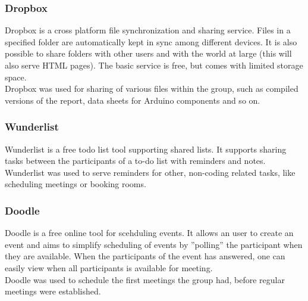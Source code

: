 \subsubsection{Dropbox}
Dropbox is a cross platform file synchronization and sharing service. Files in a specified folder are automatically kept in sync among different devices. It is also possible to share folders with other users and with the world at large (this will also serve HTML pages). The basic service is free, but comes with limited storage space.\\
Dropbox was used for sharing of various files within the group, such as compiled versions of the report, data sheets for Arduino components and so on. 

\subsubsection{Wunderlist}
Wunderlist is a free todo list tool supporting shared lists. It supports sharing tasks between the participants of a to-do list with reminders and notes.\\
Wunderlist was used to serve reminders for other, non-coding related tasks, like scheduling meetings or booking rooms.

\subsubsection{Doodle}
Doodle is a free online tool for scehduling events. It allows an user to create an event and aims to simplify scheduling of events by ''polling'' the participant when they are available. When the participants of the event has answered, one can easily view when all participants is available for meeting.\\
Doodle was used to schedule the first meetings the group had, before regular meetings were established. 